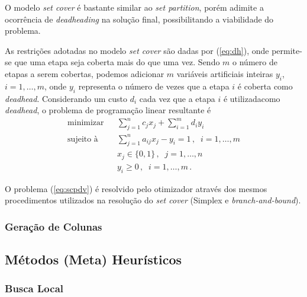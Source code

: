 \documentclass[12pt,a4paper]{article}
\newcommand{\ev}{\, ,}                                       %
\newcommand{\ep}{\, .}                                       %
\begin{document}
O modelo {\it set cover} é bastante similar ao {\it set partition}, porém adimite a ocorrência de 
{\it deadheading} na solução final, possibilitando a viabilidade do problema.

As restrições adotadas no modelo {\it set cover} são dadas por (\ref{eq:dh}), onde permite-se que 
uma etapa seja coberta mais do que uma vez. Sendo $m$ o número de etapas a serem cobertas, podemos 
adicionar $m$ variáveis artificiais inteiras $y_i$, $i = 1, \ldots, m$, onde $y_i$ representa o 
número de vezes que a etapa $i$ é coberta como {\it deadhead}. Considerando um custo $d_i$ cada vez 
que a etapa $i$ é utilizadacomo {\it deadhead}, o problema de programação linear resultante é
%
\begin{eqnarray} \label{eq:scpdv}
	\text{minimizar} && \displaystyle \sum_{j=1}^n c_j x_j + \sum_{i=1}^m d_i y_i \nonumber \\
	\text{sujeito à} && \displaystyle \sum_{j=1}^n a_{ij} x_j - y_i = 1 \ev \;\; i = 1, \ldots, m \\
	                 && x_j \in \{0, 1\} \ev \;\; j = 1, \ldots, n \nonumber \\
	                 && y_i \geq 0 \ev \;\; i = 1, \ldots, m \ep \nonumber
\end{eqnarray}

O problema (\ref{eq:scpdv}) é resolvido pelo otimizador através dos mesmos procedimentos utilizados 
na resolução do {\it set cover} (Simplex e {\it branch-and-bound}). 


\subsubsection{Geração de Colunas}
\label{sec:metodos_colunas}


\subsection{Métodos (Meta) Heurísticos}
\label{sec:metodos_heuristicas}


\subsubsection{Busca Local}
\label{sec:metodos_busca}
\end{document}
